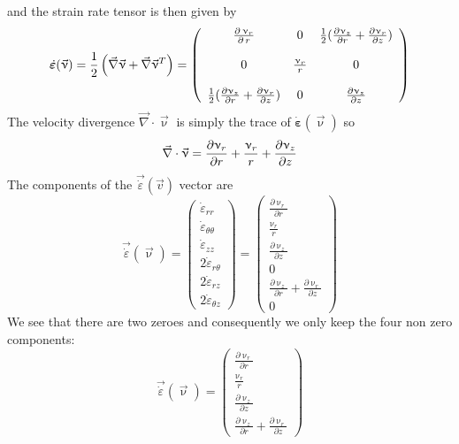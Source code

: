 and the strain rate tensor is then given by 
\begin{equation}
\dot{\bm \varepsilon}(\vec{\upnu})
=\frac12\left(\vec\nabla \vec{\upnu}+\vec\nabla \vec{\upnu}^T\right)
=
\left(
\begin{array}{ccc}
{\partial \, \upnu_r \over \partial \, r} &
0 &
\frac12({\partial \upnu_{z} \over \partial r} + {\partial \upnu_r \over \partial z}) \\ \\
0 & {\upnu_r \over r} & 0 \\ \\
\frac12({\partial \upnu_{z} \over \partial r} + {\partial \upnu_r \over \partial z} ) & 0 & {\partial \upnu_{z} \over \partial z} 
\end{array}
\right)
\end{equation}
The velocity divergence $\vec\nabla \cdot \vec{\upnu}$ is simply the trace of $\dot{\bm \varepsilon}(\vec{\upnu})$ so 
\[
\vec\nabla \cdot \vec{\upnu}
= {\partial \upnu_r \over \partial r} +{\upnu_r \over r}
+{\partial \upnu_{z} \over \partial z}
\]
The components of the $\vec{\dot{\varepsilon}}(\vec{v})$ vector are
\[
\vec{\dot{\varepsilon}}(\vec \upnu)
=
\left(
\begin{array}{c}
\dot\varepsilon_{rr} \\
\dot\varepsilon_{\theta\theta} \\
\dot\varepsilon_{zz} \\
2\dot\varepsilon_{r\theta} \\
2\dot\varepsilon_{rz} \\
2\dot\varepsilon_{\theta z} 
\end{array}
\right)
=
\left(
\begin{array}{c}
\frac{\partial \upnu_r}{\partial r} \\ 
\frac{\upnu_r}{r} \\ 
\frac{\partial \upnu_z}{\partial z} \\ 
0 \\ 
\frac{\partial \upnu_z}{\partial r}+\frac{\partial \upnu_r}{\partial z} \\ 
0
\end{array}
\right)
\]
We see that there are two zeroes and consequently
we only keep the four non zero components:
\[
\vec{\dot{\varepsilon}}(\vec \upnu)
=
\left(
\begin{array}{c}
\frac{\partial \upnu_r}{\partial r} \\ 
\frac{\upnu_r}{r} \\ 
\frac{\partial \upnu_z}{\partial z} \\ 
\frac{\partial \upnu_z}{\partial r}+\frac{\partial \upnu_r}{\partial z} 
\end{array}
\right)
\]
